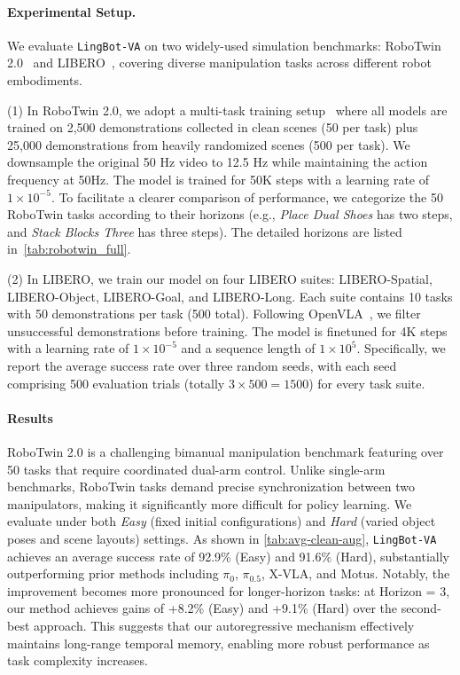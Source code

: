 \documentclass[onecolumn]{robbyant}           %
\newcommand\methodname{LingBot-VA}
\newcommand{\method}{\texttt{\methodname}\xspace}
\begin{document}
\paragraph{Experimental Setup.} We evaluate \method on two widely-used simulation benchmarks: RoboTwin 2.0~\cite{robotwin} and LIBERO~\cite{libero}, covering diverse manipulation tasks across different robot embodiments.

(1) In RoboTwin 2.0, we adopt a multi-task training setup~\cite{motus} where all models are trained on 2,500 demonstrations collected in clean scenes (50 per task) plus 25,000 demonstrations from heavily randomized scenes (500 per task). We downsample the original 50 Hz video to 12.5 Hz while maintaining the action frequency at 50Hz. The model is trained for 50K steps with a learning rate of $1\times10^{-5}$.
To facilitate a clearer comparison of performance, we categorize the 50 RoboTwin tasks according to their horizons (e.g., \textit{Place Dual Shoes} has two steps, and \textit{Stack Blocks Three} has three steps). The detailed horizons are listed in~\cref{tab:robotwin_full}.


(2) In LIBERO, we train our model on four LIBERO suites: LIBERO-Spatial, LIBERO-Object, LIBERO-Goal, and LIBERO-Long. Each suite contains 10 tasks with 50 demonstrations per task (500 total). Following OpenVLA~\cite{kim2024}, we filter unsuccessful demonstrations before training. The model is finetuned for 4K steps with a learning rate of $1 \times 10^{-5}$ and a sequence length of $1 \times 10^{5}$.  Specifically, we report the average success rate over three random seeds, with each seed comprising 500 evaluation trials (totally $3 \times 500 = 1500$) for every task suite.

\paragraph{Results}
RoboTwin 2.0 is a challenging bimanual manipulation benchmark featuring over 50 tasks that require coordinated dual-arm control.
Unlike single-arm benchmarks, RoboTwin tasks demand precise synchronization between two manipulators, making it significantly more difficult for policy learning.
We evaluate under both \textit{Easy} (fixed initial configurations) and \textit{Hard} (varied object poses and scene layouts) settings.
As shown in \cref{tab:avg-clean-aug}, \method achieves an average success rate of 92.9\% (Easy) and 91.6\% (Hard), substantially outperforming prior methods including $\pi_0$, $\pi_{0.5}$, X-VLA, and Motus.
Notably, the improvement becomes more pronounced for longer-horizon tasks: at Horizon = 3, our method achieves gains of +8.2\% (Easy) and +9.1\% (Hard) over the second-best approach.
This suggests that our autoregressive mechanism effectively maintains long-range temporal memory, enabling more robust performance as task complexity increases.
\end{document}

